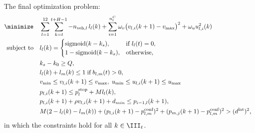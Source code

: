 The final optimization problem:
\begin{subequations}
\begin{align}
\minimize & \quad \sum_{l=1}^{12} \sum_{k = t}^{t+H-1} - n_{\text{veh},l}\, l_l(k) +  \sum_{i=1}^{n^C_l} \omega_v \big( v_{l,i} (k+1) - v_{\max} \big)^2 + \omega_u u^2_{l,i} (k) \\
\text{subject to} & \quad 
l_l (k) =
\begin{cases}
\mathrm{sigmoid} (k-k_s), & \text{if } l_l (t) = 0, \\
1 - \mathrm{sigmoid} (k-k_s), & \text{otherwise,}
\end{cases} \\
& \quad k_s - k_{0} \ge Q, \\
& \quad l_l(k) + l_m(k) \le 1 \;\text{if}\; b_{l,m} (t) > 0, \\
& \quad v_{\min} \le v_{l,i} (k+1) \le  v_{\max}, \; u_{\min} \le u_{l,i} (k+1) \le  u_{\max} \\
& \quad p_{l,i} (k+1) \le p_l^{\mathrm{stop}} + M l_l(k), \\
& \quad p_{l,i} (k+1) + \rho v_{l,i} (k+1) + d_{min} \le p_{i-1,l} (k+1), \\
& \quad M(2-l_l(k)-l_m(k)) + (p_{l,i}(k+1) - p_{l,m}^{\text{conf}})^2 + (p_{m,j}(k+1) - p_{l,m}^{\text{conf}})^2 > (d^{\text{lat}})^2,
\end{align}
\end{subequations}
in which the constraints hold for all $k \in \III_t$.


